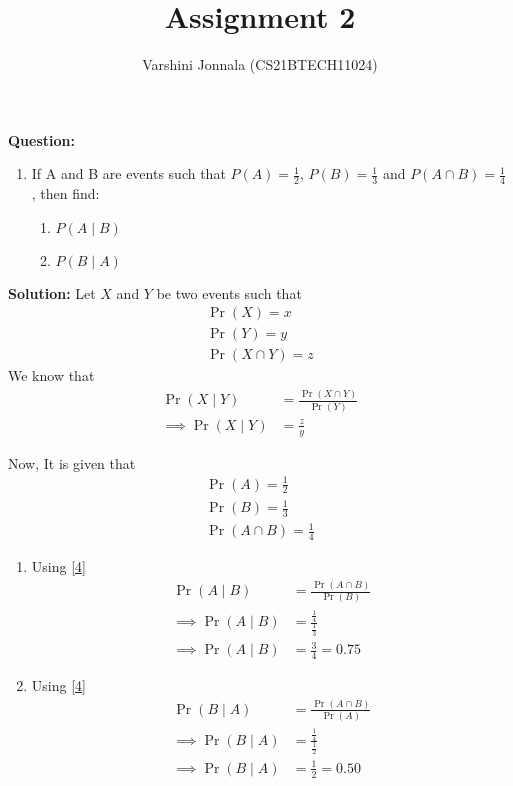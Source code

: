 \documentclass[journal,12pt,twocolumn]{IEEEtran}
\title{Assignment 2}
\author{Varshini Jonnala (CS21BTECH11024)}
\providecommand{\pr}[1]{\ensuremath{\Pr\left(#1\right)}}
\newcommand{\question}{\noindent \textbf{Question: }}
\newcommand{\solution}{\noindent \textbf{Solution: }}
\begin{document}
    \maketitle
    
    \question
    \begin{enumerate}[label=]
        \item  If A and B are events such that $P(A) = \frac{1}{2}$, $P(B)= \frac{1}{3}$ and $P(A \cap B)= \frac{1}{4}$ , then find:
    \begin{enumerate}
        \item $P(A \mid B)$
        \item $P(B \mid A)$
    \end{enumerate}
    \end{enumerate}

    \solution 
        Let $X$ and $Y$ be two events such that 
        \begin{align}
            \pr{X} = x\\
            \pr{Y} = y\\
            \pr{X \cap Y} = z
        \end{align}
         We know that
        \begin{align}
          \label{4}   \pr{X \mid Y} &= \frac{\pr{X \cap Y}}{\pr{Y}}\\
            \implies \pr{X \mid Y} &= \frac{z}{y}
        \end{align}
        
        Now, It is given that
        \begin{align}
            \pr{A} = \frac{1}{2}\\
            \pr{B} = \frac{1}{3}\\
            \pr{A \cap B} = \frac{1}{4}
        \end{align}
        
        \begin{enumerate}
            \item Using \eqref{4}
            \begin{align}
                \pr{A \mid B} &= \frac{\pr{A \cap B}}{\pr{B}}\\
                \implies \pr{A \mid B} &= {\frac{\frac{1}{4}}{\frac{1}{3}}}\\
                \implies \pr{A \mid B} &= \frac{3}{4} = 0.75
            \end{align}
            
            \item Using \eqref{4}
                \begin{align}
                \pr{B \mid A} &= \frac{\pr{A \cap B}}{\pr{A}}\\
                \implies \pr{B \mid A} &= {\frac{\frac{1}{4}}{\frac{1}{2}}}\\
                \implies \pr{B \mid A} &= \frac{1}{2} = 0.50
            \end{align} 
        \end{enumerate}
    
\end{document}
